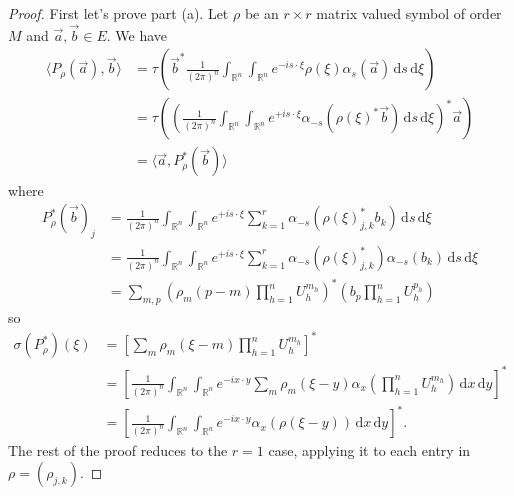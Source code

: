 \documentclass[10pt]{article}
\theoremstyle{remark}
\theoremstyle{definition}
\begin{document}
\begin{proof}
First let's prove part (a). Let $\rho$ be an $r\times r$ matrix valued symbol
of order $M$ and $\vec{a},\vec{b}\in E$. We have
\begin{align*}
\langle P_{\rho}(\vec{a}),\vec{b}\rangle
&= \tau\left(\vec{b}^*\frac{1}{(2\pi)^n}\int_{\mathbb R^n}\!\int_{\mathbb R^n}\!
e^{-is\cdot\xi}\rho(\xi)\alpha_s(\vec{a})\,\mathrm ds\,\mathrm d\xi\right) \\
&= \tau\left(\left(\frac{1}{(2\pi)^n}\int_{\mathbb R^n}\!\int_{\mathbb R^n}\!
e^{+is\cdot\xi}\alpha_{-s}(\rho(\xi)^*\vec{b})\,\mathrm ds\,\mathrm d\xi
\right)^*\vec{a}\right) \\
&= \langle\vec{a},P_{\rho}^*(\vec{b})\rangle
\end{align*}
where
\begin{align*}
P_{\rho}^*(\vec{b})_j
&= \frac{1}{(2\pi)^n}\int_{\mathbb R^n}\!\int_{\mathbb R^n}\!e^{+is\cdot\xi}
\sum_{k=1}^r\alpha_{-s}(\rho(\xi)_{j,k}^*b_k)\,\mathrm ds\,\mathrm d\xi \\
&= \frac{1}{(2\pi)^n}\int_{\mathbb R^n}\!\int_{\mathbb R^n}\!e^{+is\cdot\xi}
\sum_{k=1}^r\alpha_{-s}(\rho(\xi)_{j,k}^*)\alpha_{-s}(b_k)
\,\mathrm ds\,\mathrm d\xi \\
&= \sum_{m,p}(\rho_m(p-m)\prod_{h=1}^nU_h^{m_h})^*(b_p\prod_{h=1}^nU_h^{p_h})
\end{align*}
so
\begin{align*}
\sigma(P_{\rho}^*)(\xi)
&= \left[\sum_m\rho_m(\xi-m)\prod_{h=1}^nU_h^{m_h}\right]^* \\
&= \left[\frac{1}{(2\pi)^n}\int_{\mathbb R^n}\!\int_{\mathbb R^n}\!
e^{-ix\cdot y}\sum_m\rho_m(\xi-y)\alpha_x\left(\prod_{h=1}^nU_h^{m_h}\right)
\,\mathrm dx\,\mathrm dy\right]^* \\
&= \left[\frac{1}{(2\pi)^n}\int_{\mathbb R^n}\!\int_{\mathbb R^n}\!
e^{-ix\cdot y}\alpha_x(\rho(\xi-y))\,\mathrm dx\,\mathrm dy\right]^*.
\end{align*}
The rest of the proof reduces to the $r=1$ case, applying it to each entry
in $\rho=(\rho_{j,k})$.


\end{proof}
\end{document}
